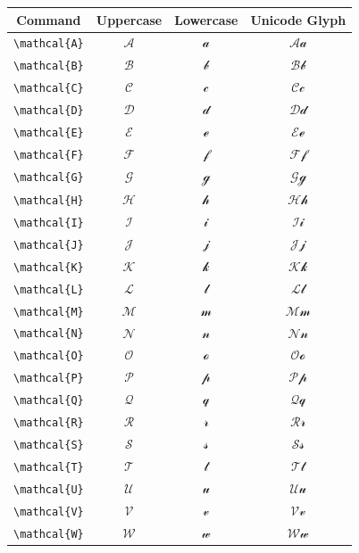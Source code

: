 \documentclass[12pt,a4paper]{article}
\begin{document}
\begin{longtable}{|c|c|c|c|}
\hline
\textbf{Command} & \textbf{Uppercase} & \textbf{Lowercase} & \textbf{Unicode Glyph} \\
\hline
\verb|\mathcal{A}| & $\mathcal{A}$ & $\mathcal{a}$ & $ 𝒜 𝒶 $ \\
\verb|\mathcal{B}| & $\mathcal{B}$ & $\mathcal{b}$ & $ ℬ 𝒷 $ \\
\verb|\mathcal{C}| & $\mathcal{C}$ & $\mathcal{c}$ & $ 𝒞 𝒸 $ \\
\verb|\mathcal{D}| & $\mathcal{D}$ & $\mathcal{d}$ & $ 𝒟 𝒹 $ \\
\verb|\mathcal{E}| & $\mathcal{E}$ & $\mathcal{e}$ & $ ℰ ℯ $ \\
\verb|\mathcal{F}| & $\mathcal{F}$ & $\mathcal{f}$ & $ ℱ 𝒻 $ \\
\verb|\mathcal{G}| & $\mathcal{G}$ & $\mathcal{g}$ & $ 𝒢 ℊ $ \\
\verb|\mathcal{H}| & $\mathcal{H}$ & $\mathcal{h}$ & $ ℋ 𝒽 $ \\
\verb|\mathcal{I}| & $\mathcal{I}$ & $\mathcal{i}$ & $ ℐ 𝒾 $ \\
\verb|\mathcal{J}| & $\mathcal{J}$ & $\mathcal{j}$ & $ 𝒥 𝒿 $ \\
\verb|\mathcal{K}| & $\mathcal{K}$ & $\mathcal{k}$ & $ 𝒦 𝓀 $ \\
\verb|\mathcal{L}| & $\mathcal{L}$ & $\mathcal{l}$ & $ ℒ 𝓁 $ \\
\verb|\mathcal{M}| & $\mathcal{M}$ & $\mathcal{m}$ & $ ℳ 𝓂 $ \\
\verb|\mathcal{N}| & $\mathcal{N}$ & $\mathcal{n}$ & $ 𝒩 𝓃 $ \\
\verb|\mathcal{O}| & $\mathcal{O}$ & $\mathcal{o}$ & $ 𝒪 ℴ $ \\
\verb|\mathcal{P}| & $\mathcal{P}$ & $\mathcal{p}$ & $ 𝒫 𝓅 $ \\
\verb|\mathcal{Q}| & $\mathcal{Q}$ & $\mathcal{q}$ & $ 𝒬 𝓆 $ \\
\verb|\mathcal{R}| & $\mathcal{R}$ & $\mathcal{r}$ & $ ℛ 𝓇 $ \\
\verb|\mathcal{S}| & $\mathcal{S}$ & $\mathcal{s}$ & $ 𝒮 𝓈 $ \\
\verb|\mathcal{T}| & $\mathcal{T}$ & $\mathcal{t}$ & $ 𝒯 𝓉 $ \\
\verb|\mathcal{U}| & $\mathcal{U}$ & $\mathcal{u}$ & $ 𝒰 𝓊 $ \\
\verb|\mathcal{V}| & $\mathcal{V}$ & $\mathcal{v}$ & $ 𝒱 𝓋 $ \\
\verb|\mathcal{W}| & $\mathcal{W}$ & $\mathcal{w}$ & $ 𝒲 𝓌 $ \\

\end{longtable}
\end{document}
